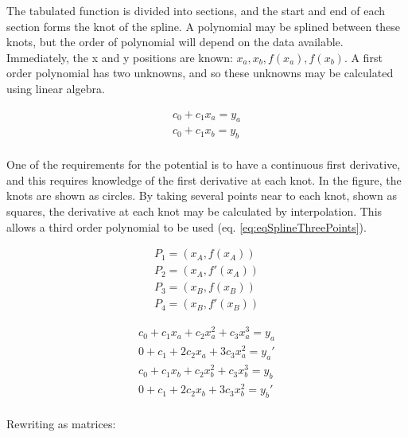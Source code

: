The tabulated function is divided into sections, and the start and end of each section forms the knot of the spline.  A polynomial may be splined between these knots, but the order of polynomial will depend on the data available.  Immediately, the x and y positions are known: $x_a, x_b, f(x_a), f(x_b)$.  A first order polynomial has two unknowns, and so these unknowns may be calculated using linear algebra.

\begin{equation}
\begin{split}
c_0 + c_1 x_a = y_a \\
c_0 + c_1 x_b = y_b \\
\end{split}
\label{eq:cubicSpline}
\end{equation}

One of the requirements for the potential is to have a continuous first derivative, and this requires knowledge of the first derivative at each knot.  In the figure, the knots are shown as circles.  By taking several points near to each knot, shown as squares, the derivative at each knot may be calculated by interpolation.  This allows a third order polynomial to be used (eq. \ref{eq:eqSplineThreePoints}).

\begin{equation}
\begin{split}
      P_{1} = \left( x_A, f(x_A) \right) \\
      P_{2} = \left( x_A, f'(x_A) \right) \\
      P_{3} = \left( x_B, f(x_B) \right) \\
      P_{4} = \left( x_B, f'(x_B) \right)
\end{split}
\label{eq:eqSplineThreePoints}
\end{equation}

\begin{equation}
\begin{split}
c_0 + c_1 x_a + c_2 x_a^2 + c_3 x_a^3 = y_a \\
0 + c_1 + 2 c_2 x_a + 3 c_3 x_a^2 = y_a' \\
c_0 + c_1 x_b + c_2 x_b^2 + c_3 x_b^3 = y_b \\
0 + c_1 + 2 c_2 x_b + 3 c_3 x_b^2 = y_b' \\
\end{split}
\label{eq:cubicSpline}
\end{equation}

Rewriting as matrices:

